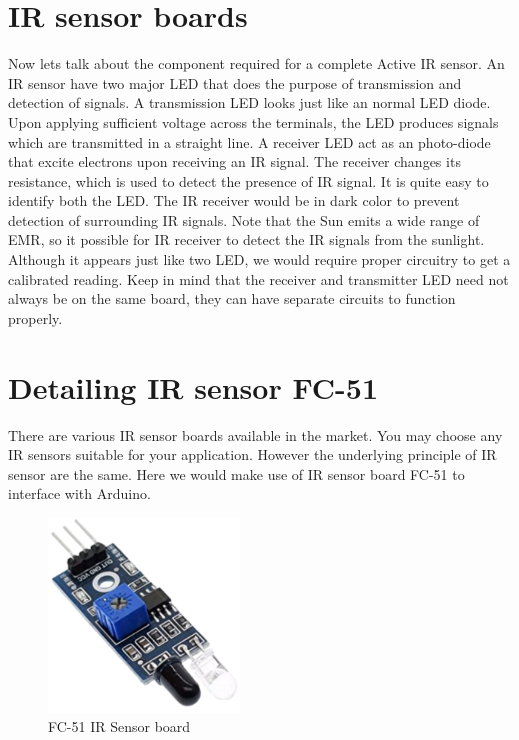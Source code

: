 \section{\ac{IR} sensor boards}
Now lets talk about the component required for a complete Active \ac{IR} sensor. An \ac{IR} sensor have two major LED that does the purpose of transmission and detection of signals. A transmission LED looks just like an normal LED diode. Upon applying sufficient voltage across the terminals, the LED produces signals which are transmitted in a straight line. A receiver LED act as an photo-diode that excite electrons upon receiving an \ac{IR} signal. The receiver changes its resistance, which is used to detect the presence of \ac{IR} signal. It is quite easy to identify both the LED. The \ac{IR} receiver would be in dark color to prevent detection of surrounding \ac{IR} signals. Note that the Sun emits a wide range of \ac{EMR}, so it possible for \ac{IR} receiver to detect the \ac{IR} signals from the sunlight. Although it appears just like two LED, we would require proper circuitry to get a calibrated reading. Keep in mind that the receiver and transmitter LED need not always be on the same board, they can have separate circuits to function properly.

\section{Detailing \ac{IR} sensor FC-51}
\par There are various \ac{IR} sensor boards available in the market. You may choose any \ac{IR} sensors suitable for your application. However the underlying principle of \ac{IR} sensor are the same. Here we would make use of \ac{IR} sensor board FC-51 to interface with Arduino.

\begin{figure}
	\centering
	\includegraphics[width=2in]{Images/IR Sensor/IR_board.png}
	\caption{FC-51 IR Sensor board}
\end{figure}

